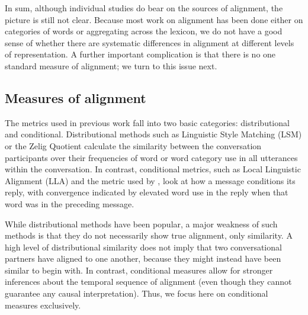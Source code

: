 \documentclass[11pt]{article}
\begin{document}
In sum, although individual studies do bear on the sources of alignment, the picture is still not clear. Because most work on alignment has been done either on categories of words or aggregating across the lexicon, we do not have a good sense of whether there are systematic differences in alignment at different levels of representation. A further important complication is that there is no one standard measure of alignment; we turn to this issue next.



\subsection{Measures of alignment}

 The metrics used in previous work fall into two basic categories: distributional and conditional. Distributional methods such as Linguistic Style Matching (LSM) \cite{NiederhofferPennebaker2002,IrelandEtAl2011} or the Zelig Quotient \cite{JonesEtAl2014} calculate the similarity between the conversation participants over their frequencies of word or word category use in all utterances within the conversation. In contrast, conditional metrics, such as Local Linguistic Alignment (LLA) \cite{FusaroliEtAl2012,WangReitterYen2014} and the metric used by \cite{DNMGamonDumais2011}, look at how a message conditions its reply, with convergence indicated by elevated word use in the reply when that word was in the preceding message.

While distributional methods have been popular, a major weakness of such methods is that they do not necessarily show true alignment, only similarity. A high level of distributional similarity does not imply that two conversational partners have aligned to one another, because they might instead have been similar to begin with. In contrast, conditional measures allow for stronger inferences about the temporal sequence of alignment (even though they cannot guarantee any causal interpretation). Thus, we focus here on conditional measures exclusively.

\end{document}
